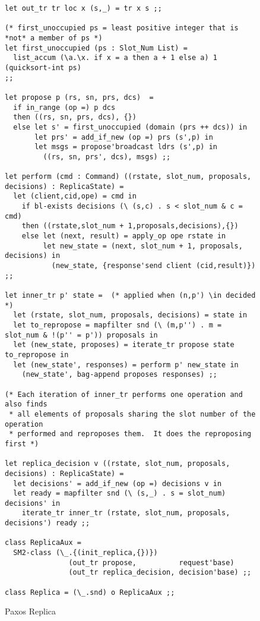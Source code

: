 \documentclass[final]{article}
\begin{document}
\begin{figure}%
  \begin{lstlisting}[basicstyle=\small]
let out_tr tr loc x (s,_) = tr x s ;;

(* first_unoccupied ps = least positive integer that is *not* a member of ps *)
let first_unoccupied (ps : Slot_Num List) =
  list_accum (\a.\x. if x = a then a + 1 else a) 1 (quicksort-int ps)
;;

let propose p (rs, sn, prs, dcs)  =
  if in_range (op =) p dcs
  then ((rs, sn, prs, dcs), {})
  else let s' = first_unoccupied (domain (prs ++ dcs)) in
       let prs' = add_if_new (op =) prs (s',p) in
       let msgs = propose'broadcast ldrs (s',p) in
         ((rs, sn, prs', dcs), msgs) ;;

let perform (cmd : Command) ((rstate, slot_num, proposals, decisions) : ReplicaState) =
  let (client,cid,ope) = cmd in
    if bl-exists decisions (\ (s,c) . s < slot_num & c = cmd)
    then ((rstate,slot_num + 1,proposals,decisions),{})
    else let (next, result) = apply_op ope rstate in
         let new_state = (next, slot_num + 1, proposals, decisions) in
           (new_state, {response'send client (cid,result)})
;;

let inner_tr p' state =  (* applied when (n,p') \in decided *)
  let (rstate, slot_num, proposals, decisions) = state in
  let to_repropose = mapfilter snd (\ (m,p'') . m = slot_num & !(p'' = p')) proposals in
  let (new_state, proposes) = iterate_tr propose state to_repropose in
  let (new_state', responses) = perform p' new_state in
    (new_state', bag-append proposes responses) ;;

(* Each iteration of inner_tr performs one operation and also finds
 * all elements of proposals sharing the slot number of the operation
 * performed and reproposes them.  It does the reproposing first *)

let replica_decision v ((rstate, slot_num, proposals, decisions) : ReplicaState) =
  let decisions' = add_if_new (op =) decisions v in
  let ready = mapfilter snd (\ (s,_) . s = slot_num) decisions' in
    iterate_tr inner_tr (rstate, slot_num, proposals, decisions') ready ;;

class ReplicaAux =
  SM2-class (\_.{(init_replica,{})})
               (out_tr propose,          request'base)
               (out_tr replica_decision, decision'base) ;;

class Replica = (\_.snd) o ReplicaAux ;;
  \end{lstlisting}
  \caption{Paxos Replica}
  \label{fig:Paxos-Replica}
\end{figure}
\end{document}
